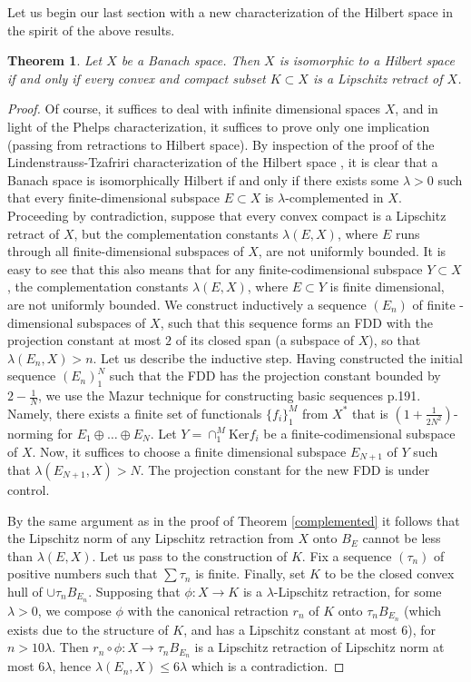 \documentclass[11pt]{amsart}
\newcommand{\<}{\langle}
\renewcommand{\>}{\rangle}
\newtheorem{theorem}{Theorem}[section]
\theoremstyle{definition}
\theoremstyle{remark}
\numberwithin{equation}{section}
\begin{document}
Let us begin our last section with
a new characterization of the Hilbert space in the spirit of the above results.

\begin{theorem}
Let $X$ be a Banach space. Then $X$ is isomorphic to a Hilbert space if and only if  every convex and compact subset $K\subset X$ is a Lipschitz retract
of $X$. 
\end{theorem}
\begin{proof}
Of course, it suffices to deal with infinite dimensional spaces $X$, and in light of the Phelps \cite{Phe58} characterization,
it suffices to prove only one implication (passing from retractions to Hilbert space).
By inspection of the proof of the Lindenstrauss-Tzafriri characterization of the Hilbert space \cite{LT71}, it is
clear that a Banach space is isomorphically Hilbert if and only if there exists some $\lambda>0$ such that every finite-dimensional
subspace $E\subset X$ is $\lambda$-complemented in $X$. 
Proceeding by contradiction, suppose that every convex compact is a Lipschitz retract of $X$, but the complementation constants $\lambda(E,X)$,
where $E$ runs through all finite-dimensional subspaces of $X$,
are not uniformly bounded. It is easy to see that this also means that for any finite-codimensional subspace $Y\subset X$, 
 the complementation constants $\lambda(E,X)$, where $E\subset Y$ is finite dimensional, are not uniformly bounded.
 We construct inductively a sequence $(E_n)$
of finite -dimensional subspaces of $X$, such that this sequence forms an FDD with the projection constant at most $2$ of its closed span
(a subspace of $X$), so that $\lambda(E_n,X)>n$. Let us describe the inductive step. Having constructed the initial sequence
$(E_n)_1^N$ such that the FDD has the projection constant bounded by $2-\frac1N$, we use the Mazur technique for constructing
basic sequences \cite{Fab1} p.191. Namely, there exists a finite set of functionals $\{f_i\}_1^M$ from $X^*$ that is $(1+\frac1{2N^2})$-norming
for $E_1\oplus\dots\oplus E_N$. Let $Y=\cap_1^M\text{Ker}f_i$ be a finite-codimensional subspace of $X$. Now, it suffices to choose
a finite dimensional subspace $E_{N+1}$ of $Y$ such that $\lambda(E_{N+1},X)>N$. The projection constant for the new FDD is under control.

By the same argument as in the proof of Theorem \ref{complemented}
 it follows that  the Lipschitz norm of any Lipschitz
retraction from $X$ onto $B_E$ cannot be less than $\lambda(E,X)$. Let us pass to the construction of $K$.
Fix a sequence $(\tau_n)$ of positive numbers such that $\sum \tau_n$ is finite.
Finally, set $K$ to be the closed convex hull of $\cup \tau_n B_{E_n}$. Supposing that $\phi:X\to K$ is a $\lambda$-Lipschitz retraction,
for some $\lambda>0$, we compose $\phi$ with the canonical retraction $r_n$ of $K$ onto $\tau_n B_{E_n}$ (which exists due to the
structure of $K$, and has a Lipschitz constant at most $6$), for $n>10\lambda$. Then $r_n\circ\phi:X\to\tau_n B_{E_n}$
is a Lipschitz retraction of Lipschitz norm at most $6\lambda$, hence
$\lambda(E_n,X)\le6\lambda$ which is a contradiction.
\end{proof}
\end{document}
